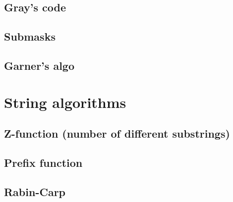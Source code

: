 \documentclass[12pt,a4paper]{article}
\begin{document}


\subsection{Gray's code}



\subsection{Submasks}



\subsection{Garner's algo}



\section{String algorithms}

\subsection{Z-function (number of different substrings)}



\subsection{Prefix function}



\subsection{Rabin-Carp}


\end{document}
